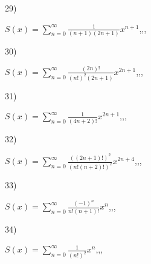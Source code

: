 \documentclass[11pt, ukrainian]{article}
\begin{document}
\vspace{0.9cm}
29) \space 
{%
{$S(x)=\sum\limits_{n=0}^{\infty}{\frac{1}{(n+1)(2n+1)}}{x^{{n+1}}}$},,, \par \smallskip  
}
\par
\vspace{0.9cm}
30) \space 
{%
{$S(x)=\sum\limits_{n=0}^{\infty}{\frac{(2n)!}{(n!)^2(2n+1)}}{x^{{2n+1}}}$},,, \par \smallskip  
}
\par
\vspace{0.9cm}
31) \space 
{%
{$S(x)=\sum\limits_{n=0}^{\infty}{\frac{1}{(4n+2)!}}{x^{{2n+1}}}$},,, \par \smallskip  
}
\par
\vspace{0.9cm}
32) \space 
{%
{$S(x)=\sum\limits_{n=0}^{\infty}{\frac{((2n+1)!)^2}{(n!(n+2)!)^2}}{x^{{2n+4}}}$},,, \par \smallskip  
}
\par
\newpage
33) \space 
{%
{$S(x)=\sum\limits_{n=0}^{\infty}{\frac{(-1)^n}{n!(n+1)!}}{x^{{n}}}$},,, \par \smallskip  
}
\par
\vspace{0.9cm}
34) \space 
{%
{$S(x)=\sum\limits_{n=0}^{\infty}{\frac{1}{(n!)^2}}{x^{{n}}}$},,, \par \smallskip  
}
\end{document}
